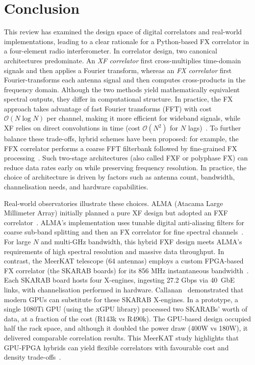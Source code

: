 \section{Conclusion}
This review has examined the design space of digital correlators and real-world implementations, leading to a clear rationale for a Python-based FX correlator in a four-element radio interferometer. In correlator design, two canonical architectures predominate. An \emph{XF correlator} first cross-multiplies time-domain signals and then applies a Fourier transform, whereas an \emph{FX correlator} first Fourier-transforms each antenna signal and then computes cross-products in the frequency domain. Although the two methods yield mathematically equivalent spectral outputs, they differ in computational structure. In practice, the FX approach takes advantage of fast Fourier transforms (FFT) with cost \( \mathcal{O}(N \log N) \) per channel, making it more efficient for wideband signals, while XF relies on direct convolutions in time (cost \( \mathcal{O}(N^2) \) for \( N \) lags)~\cite{Iguchi2008}. To further balance these trade-offs, hybrid schemes have been proposed: for example, the FFX correlator performs a coarse FFT filterbank followed by fine-grained FX processing~\cite{Iguchi2008}. Such two-stage architectures (also called FXF or polyphase FX) can reduce data rates early on while preserving frequency resolution. In practice, the choice of architecture is driven by factors such as antenna count, bandwidth, channelisation needs, and hardware capabilities.

Real-world observatories illustrate these choices. ALMA (Atacama Large Millimeter Array) initially planned a pure XF design but adopted an FXF correlator~\cite{Escoffier2007}. ALMA’s implementation uses tunable digital anti-aliasing filters for coarse sub-band splitting and then an FX correlator for fine spectral channels~\cite{Escoffier2007}. For large \( N \) and multi-GHz bandwidth, this hybrid FXF design meets ALMA’s requirements of high spectral resolution and massive data throughput. In contrast, the MeerKAT telescope (64 antennas) employs a custom FPGA-based FX correlator (the SKARAB boards) for its 856 MHz instantaneous bandwidth~\cite{Callanan2020}. Each SKARAB board hosts four X-engines, ingesting 27.2 Gbps via 40~GbE links, with channelisation performed in hardware. Callanan~\cite{Callanan2020} demonstrated that modern GPUs can substitute for these SKARAB X-engines. In a prototype, a single 1080Ti GPU (using the xGPU library) processed two SKARABs’ worth of data, at a fraction of the cost (R143k vs R490k). The GPU-based design occupied half the rack space, and although it doubled the power draw (400W vs 180W), it delivered comparable correlation results. This MeerKAT study highlights that GPU-FPGA hybrids can yield flexible correlators with favourable cost and density trade-offs~\cite{Callanan2020}.

